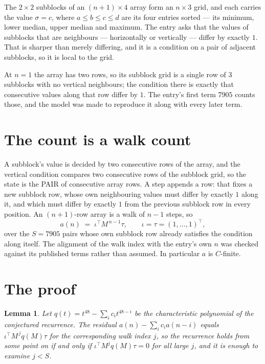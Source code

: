 \documentclass[11pt,a4paper]{article}
\theoremstyle{plain}
\newtheorem{lemma}[theorem]{Lemma}
\theoremstyle{definition}
\begin{document}
The $2\times2$ subblocks of an $(n+1)\times4$ array form an
$n\times3$ grid, and each carries the value $\sigma=c$, where $a\le b\le c\le d$ are its four entries sorted --- its minimum, lower median, upper median and maximum. The entry asks that the values of
subblocks that are neighbours --- horizontally or vertically --- differ by exactly $1$.
That is sharper than merely differing, and it is a condition on a pair of adjacent subblocks,
so it is local to the grid.

At $n=1$ the array has two rows, so its subblock grid is a single row of $3$ subblocks with
no vertical neighbours; the condition there is exactly that consecutive values along that row
differ by $1$. The entry's first term $7905$ counts those, and the model was made to
reproduce it along with every later term.

\section{The count is a walk count}

A subblock's value is decided by two consecutive rows of the array, and the
vertical condition compares two consecutive rows of the subblock grid, so the state is the
PAIR of consecutive array rows. A step appends a row: that fixes a new subblock row, whose own
neighbouring values must differ by exactly $1$ along it, and which must differ by exactly
$1$ from the previous subblock row in every position. An $(n+1)$-row array is a walk of
$n-1$ steps, so
\[
a(n)\;=\;\iota^{\!\top}M^{\,n-1}\tau,\qquad\iota=\tau=(1,\dots,1)^{\!\top},
\]
over the $S=7905$ pairs whose own subblock row already satisfies the condition along itself.
The alignment of the walk index with the entry's own $n$ was checked against its published
terms rather than assumed. In particular $a$ is $C$-finite.

\section{The proof}

\begin{lemma}\label{lem:crit}
Let $q(t)=t^{48}-\sum_i c_it^{48-i}$ be the characteristic polynomial of the
conjectured recurrence. The residual $a(n)-\sum_ic_ia(n-i)$ equals
$\iota^{\!\top}M^{\,j}q(M)\tau$ for the corresponding walk index $j$, so the recurrence
holds from some point on if and only if $\iota^{\!\top}M^{j}q(M)\tau=0$ for all large $j$,
and it is enough to examine $j<S$.
\end{lemma}
\end{document}
